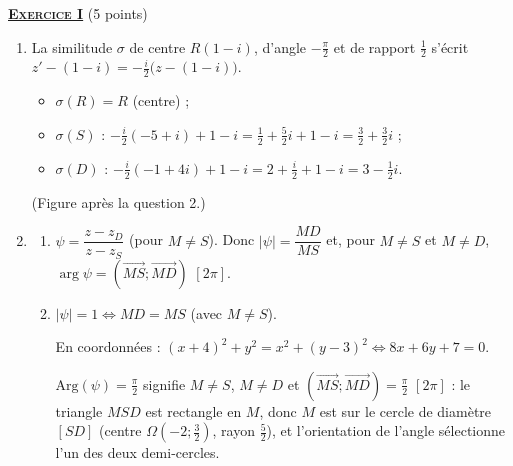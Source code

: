 \providecommand{\Plan}{(\mathscr{P})}
\providecommand{\Ouv}{(O ; \vec{u} , \vec{v})}
\providecommand{\Courbe}{(\mathscr{C})}
\providecommand{\cm}{~\mathrm{cm}}
\providecommand{\dx}{~\mathrm{d}x}
\providecommand{\Arg}[1]{\mathrm{Arg}\left( #1 \right)}
%
\noindent \underline{\textsc{\textbf{Exercice I}}} (5 points)
\begin{enumerate}
   \item {}
      La similitude $\sigma$ de centre $R(1 - i)$, d'angle $-\frac{\pi}{2}$ et de rapport $\frac{1}{2}$ s'\'ecrit
      $z' - (1 - i) = -\frac{i}{2}\big(z - (1 - i)\big)$.
      \begin{itemize}
         \item $\sigma(R) = R$ (centre) ;
         \item $\sigma(S)$ : $-\frac{i}{2}(-5 + i) + 1 - i = \frac{1}{2} + \frac{5}{2}i + 1 - i = \frac{3}{2} + \frac{3}{2}i$ ;
         \item $\sigma(D)$ : $-\frac{i}{2}(-1 + 4i) + 1 - i = 2 + \frac{i}{2} + 1 - i = 3 - \frac{1}{2}i$.
      \end{itemize}
      \par\noindent{}
      (Figure apr\`es la question 2.)
   \item
      \begin{enumerate}
         \item {}
            $\psi = \dfrac{z - z_D}{z - z_S}$ (pour $M \neq S$). Donc $|\psi| = \dfrac{MD}{MS}$ et, pour $M \neq S$ et $M \neq D$,
            $\arg\psi = \left(\overrightarrow{MS} ; \overrightarrow{MD}\right)$ $[2\pi]$.
         \item {}
            $|\psi| = 1 \iff MD = MS$ (avec $M \neq S$). \par\noindent{}
            En coordonn\'ees : $(x + 4)^2 + y^2 = x^2 + (y - 3)^2 \iff 8x + 6y + 7 = 0$.

            $\Arg{\psi} = \frac{\pi}{2}$ signifie $M \neq S$, $M \neq D$ et $\left(\overrightarrow{MS} ; \overrightarrow{MD}\right) = \frac{\pi}{2}$ $[2\pi]$ :
            le triangle $MSD$ est rectangle en $M$, donc $M$ est sur le cercle de diam\`etre $[SD]$ (centre $\Omega\left(-2 ; \frac{3}{2}\right)$,
            rayon $\frac{5}{2}$), et l'orientation de l'angle s\'electionne l'un des deux demi-cercles.
            \par\noindent{}


\end{enumerate}
\end{enumerate}
